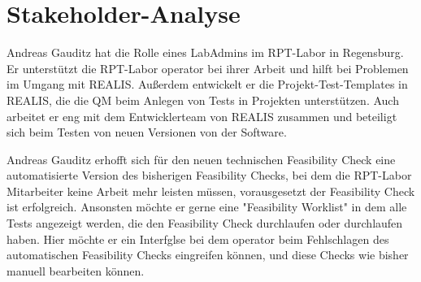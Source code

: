 \section{Stakeholder-Analyse}
Andreas Gauditz hat die Rolle eines LabAdmins im \gls{RPT}-Labor in Regensburg. Er unterstützt die \gls{RPT}-Labor \gls{operator} bei ihrer Arbeit und hilft bei Problemen im Umgang mit \gls{REALIS}. Außerdem entwickelt er die Projekt-Test-Templates in \gls{REALIS}, die die \gls{QM} beim Anlegen von Tests in Projekten unterstützen.
Auch arbeitet er eng mit dem Entwicklerteam von \gls{REALIS} zusammen und beteiligt sich beim Testen von neuen Versionen von der Software.

Andreas Gauditz erhofft sich für den neuen technischen Feasibility Check eine automatisierte Version des bisherigen Feasibility Checks, bei dem die \gls{RPT}-Labor Mitarbeiter keine Arbeit mehr leisten müssen, vorausgesetzt der Feasibility Check ist erfolgreich. Ansonsten möchte er gerne eine "Feasibility Worklist" in dem alle Tests angezeigt werden, die den Feasibility Check durchlaufen oder durchlaufen haben. Hier möchte er ein Interfglse bei dem \gls{operator} beim Fehlschlagen des automatischen Feasibility Checks eingreifen können, und diese Checks wie bisher manuell bearbeiten können.

